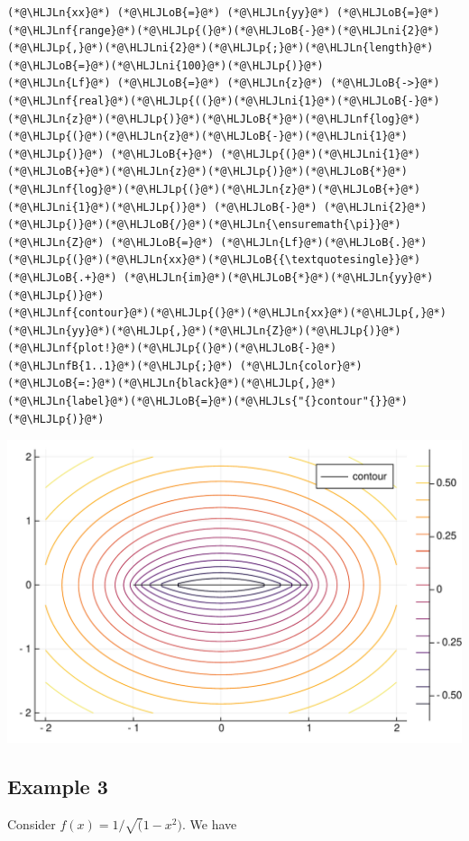\documentclass[12pt,a4paper]{article}
\newcommand{\HLJLn}[1]{#1}
\newcommand{\HLJLnf}[1]{\textcolor[RGB]{66,102,213}{#1}}
\newcommand{\HLJLs}[1]{\textcolor[RGB]{201,61,57}{#1}}
\newcommand{\HLJLnfB}[1]{\textcolor[RGB]{59,151,46}{#1}}
\newcommand{\HLJLni}[1]{\textcolor[RGB]{59,151,46}{#1}}
\newcommand{\HLJLoB}[1]{\textcolor[RGB]{102,102,102}{\textbf{#1}}}
\newcommand{\HLJLp}[1]{#1}
\begin{document}
\begin{lstlisting}
(*@\HLJLn{xx}@*) (*@\HLJLoB{=}@*) (*@\HLJLn{yy}@*) (*@\HLJLoB{=}@*) (*@\HLJLnf{range}@*)(*@\HLJLp{(}@*)(*@\HLJLoB{-}@*)(*@\HLJLni{2}@*)(*@\HLJLp{,}@*)(*@\HLJLni{2}@*)(*@\HLJLp{;}@*)(*@\HLJLn{length}@*)(*@\HLJLoB{=}@*)(*@\HLJLni{100}@*)(*@\HLJLp{)}@*)
(*@\HLJLn{Lf}@*) (*@\HLJLoB{=}@*) (*@\HLJLn{z}@*) (*@\HLJLoB{->}@*) (*@\HLJLnf{real}@*)(*@\HLJLp{((}@*)(*@\HLJLni{1}@*)(*@\HLJLoB{-}@*)(*@\HLJLn{z}@*)(*@\HLJLp{)}@*)(*@\HLJLoB{*}@*)(*@\HLJLnf{log}@*)(*@\HLJLp{(}@*)(*@\HLJLn{z}@*)(*@\HLJLoB{-}@*)(*@\HLJLni{1}@*)(*@\HLJLp{)}@*) (*@\HLJLoB{+}@*) (*@\HLJLp{(}@*)(*@\HLJLni{1}@*)(*@\HLJLoB{+}@*)(*@\HLJLn{z}@*)(*@\HLJLp{)}@*)(*@\HLJLoB{*}@*)(*@\HLJLnf{log}@*)(*@\HLJLp{(}@*)(*@\HLJLn{z}@*)(*@\HLJLoB{+}@*)(*@\HLJLni{1}@*)(*@\HLJLp{)}@*) (*@\HLJLoB{-}@*) (*@\HLJLni{2}@*)(*@\HLJLp{)}@*)(*@\HLJLoB{/}@*)(*@\HLJLn{\ensuremath{\pi}}@*)
(*@\HLJLn{Z}@*) (*@\HLJLoB{=}@*) (*@\HLJLn{Lf}@*)(*@\HLJLoB{.}@*)(*@\HLJLp{(}@*)(*@\HLJLn{xx}@*)(*@\HLJLoB{{\textquotesingle}}@*) (*@\HLJLoB{.+}@*) (*@\HLJLn{im}@*)(*@\HLJLoB{*}@*)(*@\HLJLn{yy}@*)(*@\HLJLp{)}@*)
(*@\HLJLnf{contour}@*)(*@\HLJLp{(}@*)(*@\HLJLn{xx}@*)(*@\HLJLp{,}@*)(*@\HLJLn{yy}@*)(*@\HLJLp{,}@*)(*@\HLJLn{Z}@*)(*@\HLJLp{)}@*)
(*@\HLJLnf{plot!}@*)(*@\HLJLp{(}@*)(*@\HLJLoB{-}@*)(*@\HLJLnfB{1..1}@*)(*@\HLJLp{;}@*) (*@\HLJLn{color}@*)(*@\HLJLoB{=:}@*)(*@\HLJLn{black}@*)(*@\HLJLp{,}@*) (*@\HLJLn{label}@*)(*@\HLJLoB{=}@*)(*@\HLJLs{"{}contour"{}}@*)(*@\HLJLp{)}@*)
\end{lstlisting}

\includegraphics[width=\linewidth]{figures/Lecture18_4_1.pdf}

\subsection{Example 3}
Consider $f(x) = 1/\sqrt(1-x^2)$. We have 
\end{document}
